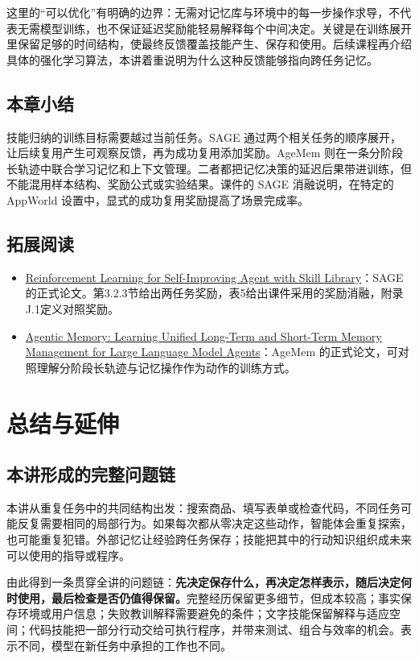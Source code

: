 \documentclass[11pt,a4paper]{article}
\begin{document}
这里的“可以优化”有明确的边界：无需对记忆库与环境中的每一步操作求导，不代表无需模型训练，也不保证延迟奖励能轻易解释每个中间决定。关键是在训练展开里保留足够的时间结构，使最终反馈覆盖技能产生、保存和使用。后续课程再介绍具体的强化学习算法，本讲着重说明为什么这种反馈能够指向跨任务记忆。

\subsection{本章小结}

技能归纳的训练目标需要越过当前任务。SAGE 通过两个相关任务的顺序展开，让后续复用产生可观察反馈，再为成功复用添加奖励。AgeMem 则在一条分阶段长轨迹中联合学习记忆和上下文管理。二者都把记忆决策的延迟后果带进训练，但不能混用样本结构、奖励公式或实验结果。课件的 SAGE 消融说明，在特定的 AppWorld 设置中，显式的成功复用奖励提高了场景完成率。

\subsection{拓展阅读}

\begin{itemize}
\item \href{https://aclanthology.org/2026.acl-long.69/}{Reinforcement Learning for Self-Improving Agent with Skill Library}：SAGE 的正式论文。第3.2.3节给出两任务奖励，表5给出课件采用的奖励消融，附录J.1定义对照奖励。
\item \href{https://aclanthology.org/2026.acl-long.981/}{Agentic Memory: Learning Unified Long-Term and Short-Term Memory Management for Large Language Model Agents}：AgeMem 的正式论文，可对照理解分阶段长轨迹与记忆操作作为动作的训练方式。
\end{itemize}

\clearpage
\section{总结与延伸}

\subsection{本讲形成的完整问题链}

本讲从重复任务中的共同结构出发：搜索商品、填写表单或检查代码，不同任务可能反复需要相同的局部行为。如果每次都从零决定这些动作，智能体会重复探索，也可能重复犯错。外部记忆让经验跨任务保存；技能把其中的行动知识组织成未来可以使用的指导或程序。

由此得到一条贯穿全讲的问题链：\textbf{先决定保存什么，再决定怎样表示，随后决定何时使用，最后检查是否仍值得保留。}完整经历保留更多细节，但成本较高；事实保存环境或用户信息；失败教训解释需要避免的条件；文字技能保留解释与适应空间；代码技能把一部分行动交给可执行程序，并带来测试、组合与效率的机会。表示不同，模型在新任务中承担的工作也不同。
\end{document}
